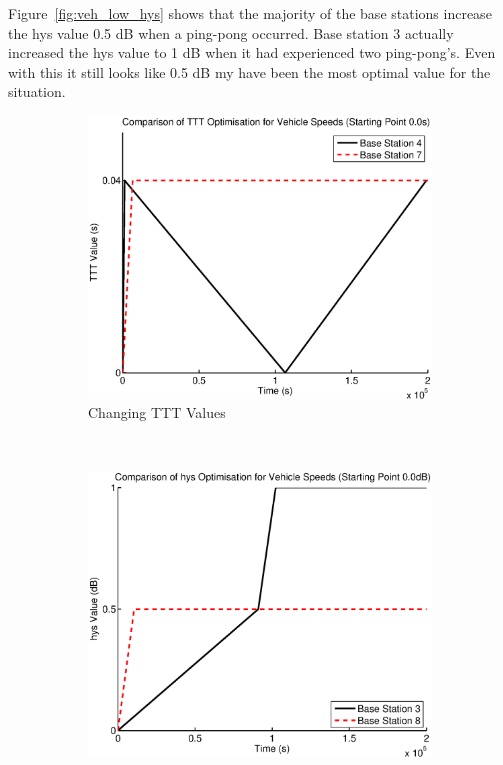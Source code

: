 Figure~\ref{fig:veh_low_hys} shows that the majority of the base stations increase the hys value 0.5 dB when a ping-pong occurred. Base station 3 actually increased the hys value to 1 dB when it had experienced two ping-pong’s. Even with this it still looks like 0.5 dB my have been the most optimal value for the situation.
\begin{figure}[H]
        \centering
        \begin{subfigure}[b]{0.49\textwidth}
                \includegraphics[width=\textwidth]{figures/vehicle_figures/low/long_ttt.eps}
                \caption{Changing TTT Values}
                \label{fig:veh_low_ttt}
        \end{subfigure}%
        ~ %
        \begin{subfigure}[b]{0.49\textwidth}
                \includegraphics[width=\textwidth]{figures/vehicle_figures/low/long_hys.eps}

\end{subfigure}
\end{figure}
